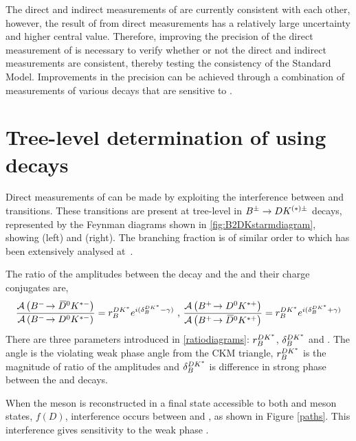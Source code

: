The direct and indirect measurements of \Pgamma are currently consistent with each other, however, the result of \Pgamma from direct measurements has a relatively large uncertainty and higher central value. Therefore, improving the precision of the direct measurement of \Pgamma is necessary to verify whether or not the direct and indirect measurements are consistent, thereby testing the consistency of the Standard Model. Improvements in the precision can be achieved through a combination of measurements of various \B decays that are sensitive to \Pgamma.

\section{Tree-level determination of \Pgamma using  decays}
\label{sec:theory:gamma}

Direct measurements of \Pgamma can be made by exploiting the interference between \decay{\bquark}{\cquark\uquarkbar\squark} and \decay{\bquark}{\uquark\cquarkbar\squark} transitions. These transitions are present at tree-level in ${{B}^\pm} \rightarrow {\ensuremath{D}}{\ensuremath{K}}^{(*)\pm}$ decays, represented by the Feynman diagrams shown in \fig\ref{fig:B2DKstarmdiagram}, showing \decay{\Bm}{\Dz\Kstarm} (left) and \decay{\Bm}{\Dzb\Kstarm} (right). The branching
fraction is of similar order to \decay{\Bm}{\Dzb\Km} which has been extensively analysed at~\cite{LHCb-PAPER-2016-003,LHCb-PAPER-2014-041,LHCb-PAPER-2015-014}.


The ratio of the amplitudes between the \decay{\Bm}{\Dzb\Kstarm} decay and the \decay{\Bm}{\Dz\Kstarm} and their charge conjugates are,
\begin{equation}
\frac{\mathcal{A}\left({{{B}^-}}\!\rightarrow {\ensuremath{{\kern 0.2em\overline{\kern -0.2em D}{}}{}^0}}{\ensuremath{{K}^{*-}}}\right)}{\mathcal{A}\left({{{B}^-}}\!\rightarrow {\ensuremath{{D}^0}}{\ensuremath{{K}^{*-}}}\right)} = r_B^{DK^*} e^{i(\delta_B^{DK^*} - \gamma)} \text{ , }
\frac{\mathcal{A}\left({{{B}^+}}\!\rightarrow {\ensuremath{{D}^0}}{\ensuremath{{K}^{*+}}}\right)}{\mathcal{A}\left({{{B}^+}}\!\rightarrow {\ensuremath{{\kern 0.2em\overline{\kern -0.2em D}{}}{}^0}}{\ensuremath{{K}^{*+}}}\right)} = r_B^{DK^*} e^{i(\delta_B^{DK^*} + \gamma)}
\label{ratiodiagrams}
\end{equation}
There are three parameters introduced in \eqn\ref{ratiodiagrams}: $r_B^{DK^*}$, $\delta_B^{DK^*}$ and \Pgamma. The angle \Pgamma is the \CP violating weak phase angle from the CKM triangle, $r_B^{DK^*}$ is the magnitude of ratio of the amplitudes and $\delta_B^{DK^*}$ is difference in strong phase between the \decay{\Bm}{\Dz\Kstarm} and \decay{\Bm}{\Dzb\Kstarm} decays.

When the \D meson is reconstructed in a final state accessible to both \Dz and \Dzb meson states, $f(D)$, interference occurs between \decay{\Bm}{\Dz\Kstarm} and \decay{\Bm}{\Dzb\Kstarm}, as shown in Figure \ref{paths}. This interference gives sensitivity to the weak phase \Pgamma.

